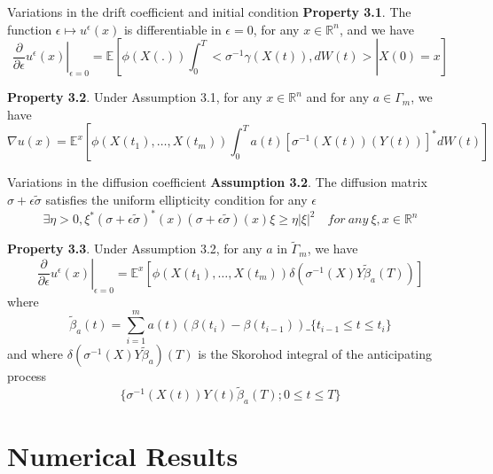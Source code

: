 \documentclass{beamer}
\begin{document}
\begin{frame}{Variations in the drift coefficient and initial condition}
\textbf{Property 3.1}. The function $\epsilon \mapsto u^\epsilon(x)$ is differentiable in $\epsilon = 0$, for any $x\in \mathbb{R}^n$, and we have
$$
\left. \frac{\partial}{\partial \epsilon} u^\epsilon(x) \right|_{\epsilon=0} = \mathbb{E}\left[ \left. \phi(X(.))\int_0^T <\sigma^{-1}\gamma(X(t)),dW(t)> \right| X(0) = x \right]
$$

\textbf{Property 3.2}. Under Assumption 3.1, for any $x\in \mathbb{R}^n$ and for any $a\in\Gamma_m$, we
have
$$
\nabla u(x) = \mathbb{E}^x \left[ \phi(X(t_1),\ldots,X(t_m))\int_0^T a(t)[\sigma^{-1}(X(t))(Y(t))]^*dW(t)  \right]
$$
\end{frame}

\begin{frame}{Variations in the diffusion coefficient}
\textbf{Assumption 3.2}. The diffusion matrix  $\sigma+\epsilon\tilde{\sigma}$ satisfies the uniform ellipticity condition for any $\epsilon$
$$
\exists \eta >0, \xi^* (\sigma+\epsilon\tilde{\sigma})^*(x)(\sigma+\epsilon\tilde{\sigma})(x)\xi \geq \eta |\xi|^2 \quad for~any~\xi,x \in \mathbb{R}^n
$$

\textbf{Property 3.3}. Under Assumption 3.2, for any $a$ in $\tilde{\Gamma}_m$, we have
$$
\left.\frac{\partial}{\partial \epsilon} u^\epsilon (x)\right|_{\epsilon=0} = \mathbb{E}^x \left[ \phi(X(t_1),\ldots,X(t_m)) \delta(\sigma^{-1}(X)Y\tilde{\beta}_a(T))  \right]
$$
where
$$
\tilde{\beta}_a(t) = \sum_{i=1}^m a(t)(\beta(t_i) - \beta(t_{i-1})) \_{\{t_{i-1}\leq t \leq t_i \}}
$$
and where $\delta(\sigma^{-1}(X)Y\tilde{\beta}_a)(T)$ is the Skorohod integral of the anticipating process
$$
\{ \sigma^{-1}(X(t))Y(t)\tilde{\beta}_a(T); 0\leq t\leq T \}
$$
\end{frame}


\section{Numerical Results}
\end{document}
